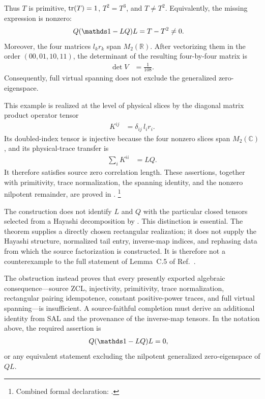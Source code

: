 \documentclass{article}
\begin{document}
Thus $T$ is primitive, $\operatorname{tr}(T)=1$, $T^2=T^3$, and $T\neq T^2$. Equivalently,
the missing expression is nonzero:
\begin{align}
    Q(\Id-LQ)L
        &= T-T^2
         \neq 0.
    \label{eq:cpgsv17_spanning_nonzero_remainder}
\end{align}
Moreover, the four matrices $l_kr_k$ span $M_2(\mathbb R)$. After vectorizing
them in the order $(00,01,10,11)$, the determinant of the resulting
four-by-four matrix is
\begin{align}
    \det V
        &= \frac{1}{108}.
    \label{eq:cpgsv17_spanning_vectorization_determinant}
\end{align}
Consequently, full virtual spanning does not exclude the generalized
zero-eigenspace.

This example is realized at the level of physical slices by the diagonal
matrix product operator tensor
\begin{align}
    K^{ij}
        &= \delta_{ij}\,l_i r_i.
    \label{eq:cpgsv17_spanning_tensor_slices}
\end{align}
Its doubled-index tensor is injective because the four nonzero slices span
$M_2(\mathbb C)$, and its physical-trace transfer is
\begin{align}
    \sum_i K^{ii}
        &= LQ.
    \label{eq:cpgsv17_spanning_physical_trace_transfer}
\end{align}
It therefore satisfies source zero correlation length. These assertions,
together with primitivity, trace normalization, the spanning identity, and
the nonzero nilpotent remainder, are proved in
.
\footnote{\sloppy Combined formal declaration:
{\scriptsize{}}.}

The construction does not identify $L$ and $Q$ with the particular closed
tensors selected from a Hayashi decomposition by
.
This distinction is essential. The theorem supplies a directly chosen
rectangular realization; it does not supply the Hayashi structure, normalized
tail entry, inverse-map indices, and rephasing data from which the source
factorization is constructed. It is therefore not a counterexample to the
full statement of Lemma~C.5 of Ref.~\cite{Cirac2016MPDO_arXiv}.

The obstruction instead proves that every presently exported algebraic
consequence---source ZCL, injectivity, primitivity, trace normalization,
rectangular pairing idempotence, constant positive-power traces, and full
virtual spanning---is insufficient. A source-faithful completion must derive
an additional identity from SAL and the provenance of the inverse-map tensors.
In the notation above, the required assertion is
\begin{align}
    Q(\Id-LQ)L
        &= 0,
    \label{eq:cpgsv17_required_rectangular_vanishing}
\end{align}
or any equivalent statement excluding the nilpotent generalized
zero-eigenspace of $QL$.
\end{document}

